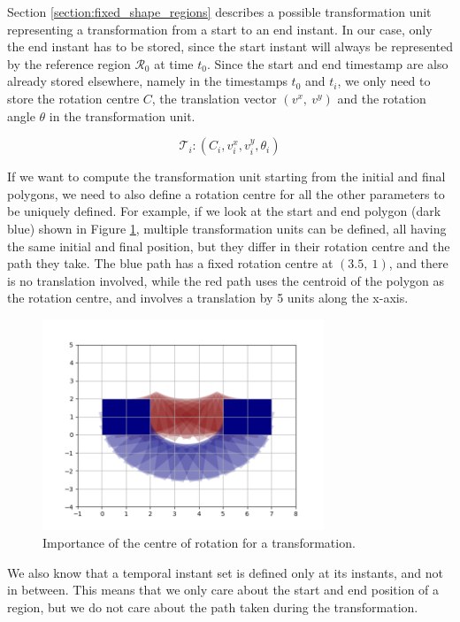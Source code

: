 Section \ref{section:fixed_shape_regions} describes a possible transformation unit representing a transformation from a start to an end instant. In our case, only the end instant has to be stored, since the start instant will always be represented by the reference region $\mathcal{R}_0$ at time $t_{0}$. Since the start and end timestamp are also already stored elsewhere, namely in the timestamps $t_0$ and $t_i$, we only need to store the rotation centre $C$, the translation vector $(v^x,\ v^y)$ and the rotation angle $\theta$ in the transformation unit.

\[
    \mathcal{T}_i: (C_i, v_i^x, v_i^y, \theta_i)
\]

If we want to compute the transformation unit starting from the initial and final polygons, we need to also define a rotation centre for all the other parameters to be uniquely defined. For example, if we look at the start and end polygon (dark blue) shown in Figure \ref{fig:center_of_rotation}, multiple transformation units can be defined, all having the same initial and final position, but they differ in their rotation centre and the path they take. The blue path has a fixed rotation centre at $(3.5,\ 1)$, and there is no translation involved, while the red path uses the centroid of the polygon as the rotation centre, and involves a translation by 5 units along the x-axis.

\begin{figure}[h!]
    \centering
    \includegraphics[width=0.75\textwidth]{images/center_of_rotation_importance.png}
    \caption{Importance of the centre of rotation for a transformation.}
    \label{fig:center_of_rotation}
\end{figure}


We also know that a temporal instant set is defined only at its instants, and not in between. This means that we only care about the start and end position of a region, but we do not care about the path taken during the transformation. 

